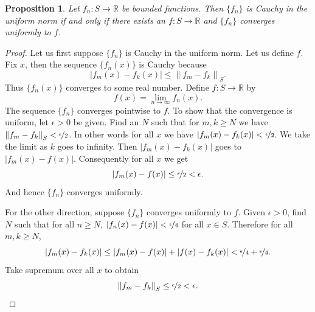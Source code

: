 \documentclass[12pt,openany]{book}
\newcommand{\abs}[1]{\left\lvert {#1} \right\rvert}
\newcommand{\norm}[1]{\left\lVert {#1} \right\rVert}
\newcommand{\R}{{\mathbb{R}}}
\theoremstyle{plain}
\newtheorem{prop}[thm]{Proposition}
\theoremstyle{remark}
\theoremstyle{definition}
\theoremstyle{exercise}
\theoremstyle{example}
\begin{document}
\begin{prop} \label{prop:uniformcauchy}
Let $f_n \colon S \to \R$ be bounded functions.
Then $\{ f_n \}$ is Cauchy in the uniform norm if and only if
there exists an $f \colon S \to \R$ and $\{ f_n \}$ converges
uniformly to $f$.
\end{prop}

\begin{proof}
Let us first suppose $\{ f_n \}$ is Cauchy in the uniform norm.
Let us define $f$.  Fix $x$, then
the sequence $\{ f_n(x) \}$ is Cauchy because
\begin{equation*}
\abs{f_m(x)-f_k(x)}
\leq
\norm{f_m-f_k}_S .
\end{equation*}
Thus $\{ f_n(x) \}$ converges to some real number.  Define $f \colon S
\to \R$ by
\begin{equation*}
f(x) = \lim_{n \to \infty} f_n(x) .
\end{equation*}
The sequence
$\{ f_n \}$ converges pointwise to $f$.  To show that the convergence
is uniform, let $\epsilon > 0$ be given.  Find an $N$ such that
for $m, k \geq N$ we have
$\norm{f_m-f_k}_S < \nicefrac{\epsilon}{2}$.  In other words for
all $x$ we have
$\abs{f_m(x)-f_k(x)} < \nicefrac{\epsilon}{2}$.  We take the limit
as $k$ goes to infinity.  Then $\abs{f_m(x)-f_k(x)}$
goes to $\abs{f_m(x)-f(x)}$.
Consequently for all $x$ we get
\begin{equation*}
\abs{f_m(x)-f(x)} \leq \nicefrac{\epsilon}{2} < \epsilon .
\end{equation*}
And hence $\{ f_n \}$ converges uniformly.

For the other direction, suppose $\{ f_n \}$ converges uniformly to
$f$.  Given $\epsilon > 0$, find $N$ such that for all $n \geq N$,
$\abs{f_n(x)-f(x)} < \nicefrac{\epsilon}{4}$ for all $x \in S$.
Therefore for all $m, k \geq N$,
\begin{equation*}
\abs{f_m(x)-f_k(x)}
\leq
\abs{f_m(x)-f(x)}+\abs{f(x)-f_k(x)} < \nicefrac{\epsilon}{4} +
\nicefrac{\epsilon}{4} .
\end{equation*}
Take supremum over all $x$ to obtain
\begin{equation*}
\norm{f_m-f_k}_S \leq \nicefrac{\epsilon}{2} < \epsilon .  \qedhere
\end{equation*}
\end{proof}
\end{document}
